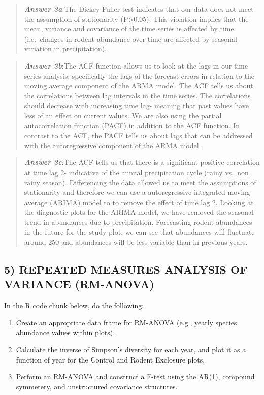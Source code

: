 \documentclass[]{article}
\providecommand{\tightlist}{%
  \setlength{\itemsep}{0pt}\setlength{\parskip}{0pt}}
\begin{document}
\begin{quote}
\textbf{\emph{Answer 3a}}:The Dickey-Fuller test indicates that our data
does not meet the assumption of stationarity (P\textgreater{}0.05). This
violation implies that the mean, variance and covariance of the time
series is affected by time (i.e.~changes in rodent abundance over time
are affected by seasonal variation in precipitation).
\end{quote}

\begin{quote}
\textbf{\emph{Answer 3b}}:The ACF function allows us to look at the lags
in our time series analysis, specifically the lags of the forecast
errors in relation to the moving average component of the ARMA model.
The ACF tells us about the correlations between lag intervals in the
time series. The correlations should decrease with increasing time lag-
meaning that past values have less of an effect on current values. We
are also using the partial autocorrelation function (PACF) in addition
to the ACF function. In contrast to the ACF, the PACF tells us about
lags that can be addressed with the autoregressive component of the ARMA
model.
\end{quote}

\begin{quote}
\textbf{\emph{Answer 3c}}:The ACF tells us that there is a significant
positive correlation at time lag 2- indicative of the annual
precipitation cycle (rainy vs.~non rainy season). Differencing the data
allowed us to meet the assumptions of stationarity and therefore we can
use a autoregressive integrated moving average (ARIMA) model to to
remove the effect of time lag 2. Looking at the diagnostic plots for the
ARIMA model, we have removed the seasonal trend in abundances due to
precipitation. Forecasting rodent abundances in the future for the study
plot, we can see that abundances will fluctuate around 250 and
abundances will be less variable than in previous years.
\end{quote}

\subsection{5) REPEATED MEASURES ANALYSIS OF VARIANCE
(RM-ANOVA)}\label{repeated-measures-analysis-of-variance-rm-anova}

In the R code chunk below, do the following:

\begin{enumerate}
\def\labelenumi{\arabic{enumi}.}
\tightlist
\item
  Create an appropriate data frame for RM-ANOVA (e.g., yearly species
  abundance values within plots).
\item
  Calculate the inverse of Simpson's diversity for each year, and plot
  it as a function of year for the Control and Rodent Exclosure plots.
\item
  Perform an RM-ANOVA and construct a F-test using the AR(1), compound
  symmetery, and unstructured covariance structures.
\end{enumerate}
\end{document}
